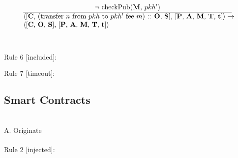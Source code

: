 \documentclass[a4paper]{llncs}
\begin{document}
\begin{equation}{}
\frac{\text{$\neg$ checkPub(\MANAGERS, $pkh'$)}}{\parbox{4.2in}{\text{$\langle$[\ACCOUNTS, (transfer $n$ from $pkh$ to $pkh'$ fee $m$) :: \OPERATIONS, \CONTRACTS], [\PENDING, \ACCEPTED, \MANAGERS, \CONTRACTORS, \TIME]$\rangle \rightarrow$ }\\
\text{$\langle$[\ACCOUNTS, \OPERATIONS, \CONTRACTS], [\PENDING, \ACCEPTED, \MANAGERS, \CONTRACTORS, \TIME]$\rangle$}}} 
\end{equation}
~\\
~\\
Rule 6 [included]:
\begin{mathpar}
\end{mathpar}
Rule 7 [timeout]:
\begin{mathpar}
\end{mathpar}

\subsection{Smart Contracts}
~\\
A. Originate
~\\
~\\

Rule 2 [injected]:
\end{document}
